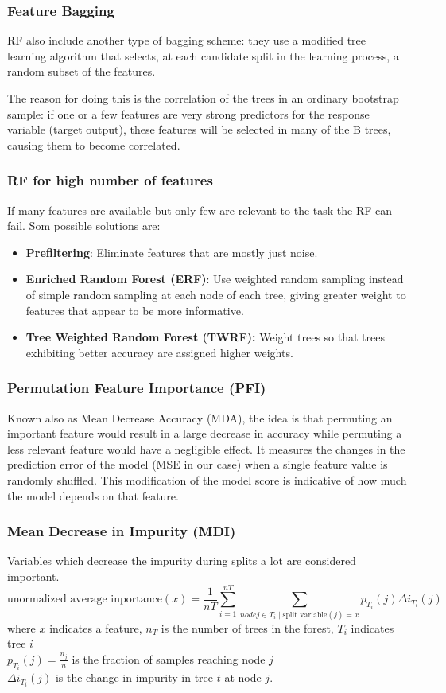 \subsubsection{Feature Bagging}
RF also include another type of bagging scheme: they use a modified tree
learning algorithm that selects, at each candidate split in the learning process, a random
subset of the features.

The reason for doing this is the correlation of the trees in an ordinary bootstrap sample: if one or a few
features are very strong predictors for the response variable (target output), these features will be
selected in many of the B trees, causing them to become correlated.

\subsubsection{RF for high number of features}
If many features are available but only few are relevant to the task the RF can fail. Som possible solutions are:
\begin{itemize}
    \item \textbf{Prefiltering}: Eliminate features that are mostly just noise.
    \item \textbf{Enriched Random Forest (ERF)}: Use weighted random sampling instead of simple random sampling
    at each node of each tree, giving greater weight to features that appear to be more informative.
    \item \textbf{Tree Weighted Random Forest (TWRF):} Weight trees so that trees exhibiting better accuracy are
    assigned higher weights.
\end{itemize}

\subsubsection{Permutation Feature Importance (PFI)}
Known also as Mean Decrease Accuracy (MDA), the idea is that permuting an important feature would result in a large decrease in accuracy while permuting a less relevant feature would have a negligible effect.
It measures the changes in the prediction error of the model (MSE in our case) when a single feature value is randomly shuffled.
This modification of the model score is indicative of how much the model depends on that feature.

\subsubsection{Mean Decrease in Impurity (MDI)}
Variables which decrease the impurity during splits a lot are considered important.
\begin{equation}
    \text{unormalized average inportance}(x)=\frac{1}{nT}\sum_{i=1}^{nT}\sum_{node j\in T_i\mid\text{split variable}(j)=x} p_{T_i}(j)\Delta i_{T_i}(j)
\end{equation}
where $x$ indicates a feature, $n_T$ is the number of trees in the forest, $T_i$ indicates tree $i$\\
$p_{T_i}(j)=\frac{n_j}{n}$ is the fraction of samples reaching node $j$ \\
$\Delta i_{T_i}(j)$ is the change in impurity in tree $t$ at node $j$.


